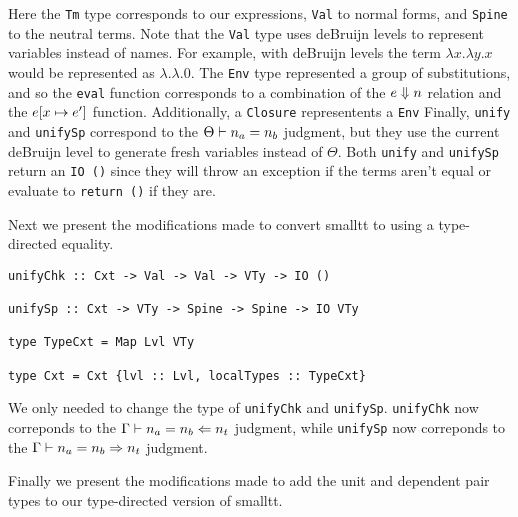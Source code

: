 Here the \lstinline{Tm} type corresponds to our expressions, \lstinline{Val} to normal forms, and \lstinline{Spine} to the neutral terms.
Note that the \lstinline{Val} type uses deBruijn levels to represent variables instead of names.
For example, with deBruijn levels the term $\lambda x. \lambda y. x$ would be represented as $\lambda. \lambda. 0$.
The \lstinline{Env} type represented a group of substitutions, and so the \lstinline{eval} function corresponds to a combination of the $e \Downarrow n$ relation and the $e [x \mapsto e']$ function.
Additionally, a \lstinline{Closure} representents a \lstinline{Env}
Finally, \lstinline{unify} and \lstinline{unifySp} correspond to the $\Theta \vdash n_a = n_b$ judgment, but they use the current deBruijn level to generate fresh variables instead of $\Theta$.
Both \lstinline{unify} and \lstinline{unifySp} return an \lstinline{IO ()} since they will throw an exception if the terms aren't equal or evaluate to \lstinline{return ()} if they are.

\newpage

Next we present the modifications made to convert smalltt to using a type-directed equality.

\begin{lstlisting}
unifyChk :: Cxt -> Val -> Val -> VTy -> IO ()

unifySp :: Cxt -> VTy -> Spine -> Spine -> IO VTy

type TypeCxt = Map Lvl VTy

type Cxt = Cxt {lvl :: Lvl, localTypes :: TypeCxt}
\end{lstlisting}

We only needed to change the type of \lstinline{unifyChk} and \lstinline{unifySp}.
\lstinline{unifyChk} now correponds to the $\Gamma \vdash n_a = n_b \Leftarrow n_t$ judgment, while \lstinline{unifySp} now correponds to the $\Gamma \vdash n_a = n_b \Rightarrow n_t$ judgment.

Finally we present the modifications made to add the unit and dependent pair types to our type-directed version of smalltt.


